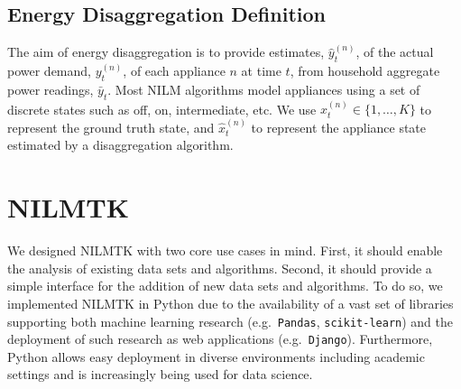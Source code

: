 \documentclass{sig-alternate}
\newcommand{\bluecolor}[1]{\textcolor{blue}{#1}}
\newcommand{\secref}[1]{Section~\ref{#1}}
\begin{document}
\subsection{Energy Disaggregation Definition}
\label{sec:notation}
\noindent The aim of energy disaggregation is to provide estimates, $\hat{y}^{(n)}_t$, of the actual power demand, $y^{(n)}_t$, of each appliance $n$ at time $t$, from household aggregate power readings, $\bar{y}_t$. Most NILM algorithms model appliances using a set of discrete states such as off, on, intermediate, etc.  We use $x^{(n)}_t \in \{1, \dots, K\}$ to represent the ground truth state, and $\hat{x}^{(n)}_t$ to represent the appliance state estimated by a disaggregation algorithm.

\section{NILMTK}
\label{sec:nilmtk}

\noindent
We designed NILMTK with two core use cases in mind. First, it should enable the analysis of existing data sets and algorithms. Second, it should provide a simple interface for the addition of new data sets and algorithms.
To do so, we implemented NILMTK in Python due to the availability of a vast set of libraries supporting both machine learning research (e.g.\ \texttt{Pandas}, \texttt{scikit-learn}) and the deployment of such research as web applications (e.g.\ \texttt{Django}). Furthermore, Python allows easy deployment in diverse environments including academic settings and is increasingly being used for data science.

\end{document}
